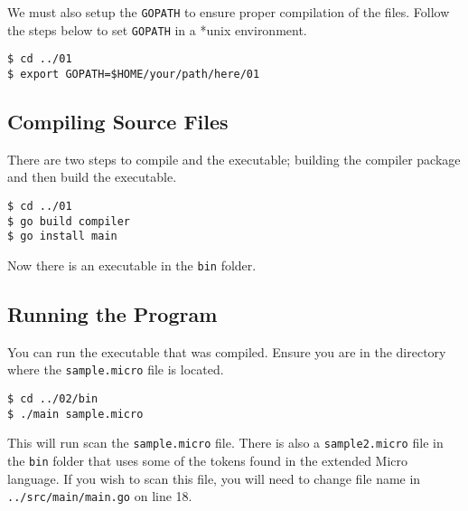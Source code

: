 \documentclass[a4paper]{article}
\begin{document}
We must also setup the \verb~GOPATH~ to ensure proper compilation of the files.
Follow the steps below to set \verb~GOPATH~ in a *unix environment. 
\begin{verbatim}
$ cd ../01
$ export GOPATH=$HOME/your/path/here/01
\end{verbatim}

\subsection{Compiling Source Files}
\label{sec-2-3}
There are two steps to compile and the executable; building the compiler
package and then build the executable.
\begin{verbatim}
$ cd ../01
$ go build compiler
$ go install main
\end{verbatim}
Now there is an executable in the \verb~bin~ folder.

\subsection{Running the Program}
\label{sec-2-4}
You can run the executable that was compiled. Ensure you are in the 
directory where the \verb~sample.micro~ file is located.
\begin{verbatim}
$ cd ../02/bin
$ ./main sample.micro
\end{verbatim}
This will run scan the \verb~sample.micro~ file. There is also a \verb~sample2.micro~
file in the \verb~bin~ folder that uses some of the tokens found in the 
extended Micro language. If you wish to scan this file, you will need to
change file name in \verb~../src/main/main.go~ on line 18.
\end{document}
